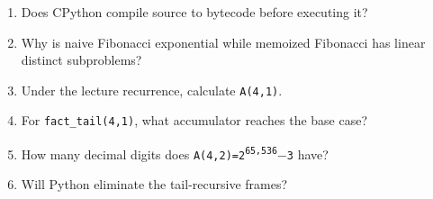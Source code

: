 \documentclass[11pt]{article}
\begin{document}
\begin{keepsection}
\begin{enumerate}
\item Does CPython compile source to bytecode before executing it?
\item Why is naive Fibonacci exponential while memoized Fibonacci has linear distinct subproblems?
\item Under the lecture recurrence, calculate \texttt{A(4,1)}.
\item For \texttt{fact\_tail(4,1)}, what accumulator reaches the base case?
\item How many decimal digits does \texttt{A(4,2)=2\textsuperscript{65,536}\ensuremath{-}3} have?
\item Will Python eliminate the tail-recursive frames?
\end{enumerate}

\end{keepsection}
\end{document}
